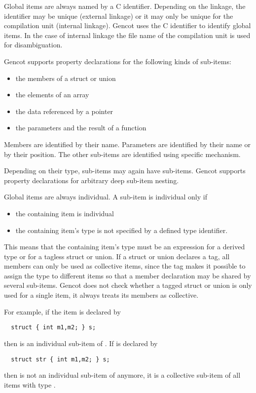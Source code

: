 Global items are always named by a C identifier. Depending on the linkage, the identifier may be unique (external linkage)
or it may only be unique for the compilation unit (internal linkage). Gencot uses the C identifier to identify global 
items. In the case of internal linkage the file name of the compilation unit is used for disambiguation.

Gencot supports property declarations for the following kinds of sub-items:
\begin{itemize}
\item the members of a struct or union
\item the elements of an array
\item the data referenced by a pointer
\item the parameters and the result of a function
\end{itemize}
Members are identified by their name. Parameters are identified by their name or by their position. The other
sub-items are identified using specific mechanism.

Depending on their type, sub-items may again have sub-items. Gencot supports property declarations for arbitrary
deep sub-item nesting.

Global items are always individual. A sub-item is individual only if
\begin{itemize}
\item the containing item is individual
\item the containing item's type is not specified by a defined type identifier.
\end{itemize}
This means that the containing item's type must be an expression for a derived type or for a tagless struct or union.
If a struct or union declares a tag, all members can only be used as collective items, since the tag makes it possible
to assign the type to different items so that a member declaration may be shared by several sub-items. Gencot does
not check whether a tagged struct or union is only used for a single item, it always treats its members as collective.

For example, if the item  is declared by
\begin{verbatim}
  struct { int m1,m2; } s;
\end{verbatim}
then  is an individual sub-item of . If  is declared by
\begin{verbatim}
  struct str { int m1,m2; } s;
\end{verbatim}
then  is not an individual sub-item of  anymore, it is a collective sub-item of all items with
type .

